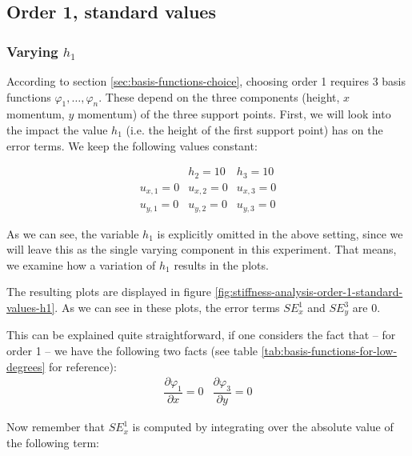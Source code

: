 \documentclass{article}
\newcommand{\pd}[2]{\dfrac{\partial #1}{\partial #2}}
\renewcommand{\phi}{\varphi}
\begin{document}
\subsection{Order 1, standard values}
\label{sec:stiffness-analysis-order-1-standard}

\subsubsection{\texorpdfstring{Varying $h_1$}{Varying h1}}
\label{sec:stiffness-analysis-standard-values-var-h1}

According to section \ref{sec:basis-functions-choice}, choosing order 1 requires 3 basis functions $\phi_1,\dots,\phi_n$. These depend on the three components (height, $x$ momentum, $y$ momentum) of the three support points. First, we will look into the impact the value $h_1$ (i.e. the height of the first support point) has on the error terms. We keep the following values constant:

\begin{eqnarray*}
  & h_2 = 10 & h_3 = 10 \\
  u_{x,1} = 0 & u_{x,2} = 0 & u_{x,3} = 0 \\
  u_{y,1} = 0 & u_{y,2} = 0 & u_{y,3} = 0
\end{eqnarray*}

As we can see, the variable $h_1$ is explicitly omitted in the above setting, since we will leave this as the single varying component in this experiment. That means, we examine how a variation of $h_1$ results in the plots.



The resulting plots are displayed in figure \ref{fig:stiffness-analysis-order-1-standard-values-h1}. As we can see in these plots, the error terms $SE_x^1$ and $SE_y^3$ are 0.

This can be explained quite straightforward, if one considers the fact that -- for order 1 -- we have the following two facts (see table \ref{tab:basis-functions-for-low-degrees} for reference):
\begin{eqnarray*}
  \pd{\phi_1}{x} = 0 & \pd{\phi_3}{y} = 0
\end{eqnarray*}

Now remember that $SE_x^1$ is computed by integrating over the absolute value of the following term:
\end{document}
